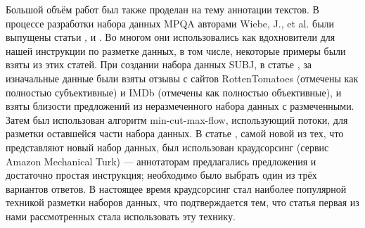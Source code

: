 \documentclass[conference]{IEEEtran}
\begin{document}
Большой объём работ был также проделан на тему аннотации текстов. В процессе разработки набора данных MPQA авторами Wiebe, J., et al. были выпущены статьи \cite{instructions-for-annotating-opinions}, \cite{annotating-expressions-of-opinions} и \cite{annotating-private-states}. Во многом они использовались как вдохновители для нашей инструкции по разметке данных, в том числе, некоторые примеры были взяты из этих статей. При создании набора данных SUBJ, в статье \cite{subj}, за изначальные данные были взяты отзывы с сайтов RottenTomatoes (отмечены как полностью субъективные) и IMDb (отмечены как полностью объективные), и взяты близости предложений из неразмеченного набора данных с размеченными. Затем был использован алгоритм min-cut-max-flow, использующий потоки, для разметки оставшейся части набора данных. В статье \cite{wikipedia-biased-statements}, самой новой из тех, что представляют новый набор данных, был использован краудсорсинг (сервис Amazon Mechanical Turk) --- аннотаторам предлагались предложения и достаточно простая инструкция; необходимо было выбрать один из трёх вариантов ответов. В настоящее время краудсорсинг стал наиболее популярной техникой разметки наборов данных, что подтверждается тем, что статья \cite{wikipedia-biased-statements} первая из нами рассмотренных стала использовать эту технику.
\end{document}
